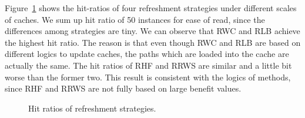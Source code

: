 Figure~\ref{fig:comparison-hit} shows the hit-ratios of four refreshment strategies under different scales of caches.
We sum up hit ratio of 50 instances for ease of read, since the differences among strategies are tiny.
We can observe that RWC and RLB achieve the highest hit ratio. The reason is that even though RWC and RLB are based on different logics to update caches, the paths which are loaded into the cache are actually the same.
The hit ratios of RHF and RRWS are similar and a little bit worse than the former two. This result is consistent with the logics of methods, since RHF and RRWS are not fully based on large benefit values. 
\begin{figure}[htbp]
\centering
 \caption{Hit ratios of refreshment strategies.}
 \label{fig:comparison-hit}
\end{figure}


